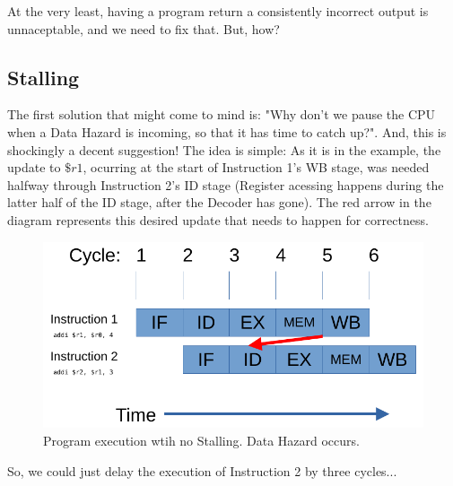 \documentclass[12pt,twoside]{reedthesis}
\begin{document}
At the very least, having a program return a consistently incorrect output is unnaceptable, and we need to fix that. But, how?

\subsection{Stalling}

The first solution that might come to mind is: "Why don't we pause the CPU when a Data Hazard is incoming, so that it has time to catch up?". And, this is shockingly a decent suggestion! The idea is simple: As it is in the example, the update to $\$r1$, ocurring at the start of Instruction 1's WB stage, was needed halfway through Instruction 2's ID stage (Register acessing happens during the latter half of the ID stage, after the Decoder has gone). The red arrow in the diagram represents this desired update that needs to happen for correctness.

\begin{figure}[h!]

	\centering
	\includegraphics[scale=0.9]{nostall}
	\caption{Program execution wtih no Stalling. Data Hazard occurs.}
	\label{no-stall}
\end{figure}

So, we could just delay the execution of Instruction 2 by three cycles...
\end{document}
